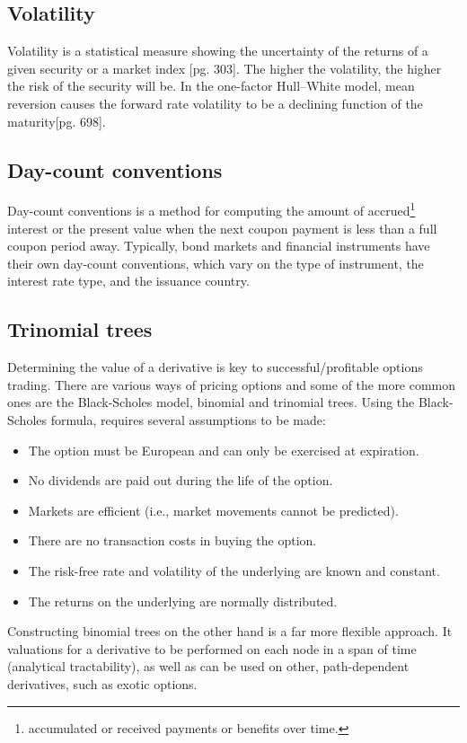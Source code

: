 \subsection{Volatility}
Volatility is a statistical measure showing the uncertainty of the returns of a given security or a market index \cite{ofod}[pg. 303]. The higher the volatility, the higher the risk of the security will be. In the one-factor Hull–White model, mean reversion causes the forward rate volatility to be a declining function of the maturity\cite{ofod}[pg. 698]. 

\subsection{Day-count conventions}
Day-count conventions is a method for computing the amount of accrued\footnote{accumulated or received payments or benefits over time.} interest or the present value when the next coupon payment is less than a full coupon period away. Typically, bond markets and financial instruments have their own day-count conventions, which vary on the type of instrument, the interest rate type, and the issuance country. 

\subsection{Trinomial trees}
Determining the value of a derivative is key to successful/profitable options trading. There are various ways of pricing options and some of the more common ones are the Black-Scholes model\cite{blackscholes}, binomial and trinomial trees. Using the Black-Scholes formula, requires several assumptions to be made: 
\begin{itemize}
    \item The option must be European and can only be exercised at expiration.
    \item No dividends are paid out during the life of the option.
    \item Markets are efficient (i.e., market movements cannot be predicted).
    \item There are no transaction costs in buying the option.
    \item The risk-free rate and volatility of the underlying are known and constant.
    \item The returns on the underlying are normally distributed.
\end{itemize}
Constructing binomial trees on the other hand is a far more flexible approach. It valuations for a derivative to be performed on each node in a span of time (analytical tractability), as well as can be used on other, path-dependent derivatives, such as exotic options. 


